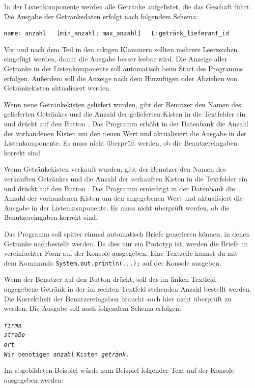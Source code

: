 \begin{compactenum}[a)]
In der Listenkomponente werden alle Getränke aufgelistet, die das Geschäft führt. Die Ausgabe der
Getränkedaten erfolgt nach folgendem Schema:

\verb|name: anzahl   [min_anzahl; max_anzahl]   L:getränk_lieferant_id|

Vor und nach dem Teil in den eckigen Klammern sollten mehrere Leerzeichen
eingefügt werden, damit die Ausgabe besser lesbar wird. Die Anzeige aller
Getränke in der Listenkomponente soll automatisch beim Start des Programms
erfolgen. Außerdem soll die Anzeige nach dem Hinzufügen oder Abziehen von
Getränkekisten aktualisiert werden.

Wenn neue Getränkekisten geliefert wurden, gibt der Benutzer den Namen des
gelieferten Getränkes und die Anzahl der gelieferten Kisten in die Textfelder
ein und drückt auf den Button . Das Programm erhöht in der
Datenbank die Anzahl der vorhandenen Kisten um den neuen Wert und aktualisiert
die Ausgabe in der Listenkomponente. Es muss nicht überprüft werden, ob die
Benutzereingaben korrekt sind.

Wenn Getränkekisten verkauft wurden, gibt der Benutzer den Namen des verkauften
Getränkes und die Anzahl der verkauften Kisten in die Textfelder ein und drückt
auf den Button . Das Programm erniedrigt in der Datenbank die
Anzahl der vorhandenen Kisten um den angegebenen Wert und aktualisiert
die Ausgabe in der Listenkomponente. Es muss nicht überprüft werden, ob die
Benutzereingaben korrekt sind.

Das Programm soll später einmal automatisch Briefe generieren können, in denen
Getränke nachbestellt werden. Da dies nur ein Prototyp ist, werden die \glqq Briefe\grqq\
in vereinfachter Form auf der Konsole ausgegeben. Eine Textzeile kannst du mit
dem Kommando \lstinline|System.out.println(...);| auf der Konsole ausgeben.

Wenn der Benutzer auf den Button  drückt, soll das im
linken Textfeld angegebene Getränk in der im rechten Textfeld stehenden Anzahl
bestellt werden. Die Korrektheit der Benutzereingaben braucht auch hier nicht
überprüft zu werden. Die Ausgabe soll nach folgendem Schema erfolgen:

\texttt{\slshape{firma}\\
\slshape{straße}\\
\slshape{ort}}\\
\texttt{Wir benötigen \slshape{anzahl}} \texttt{Kisten \slshape{getränk}.}

Im abgebildeten Beispiel würde zum Beispiel folgender Text auf der Konsole
ausgegeben werden:


\end{compactenum}
